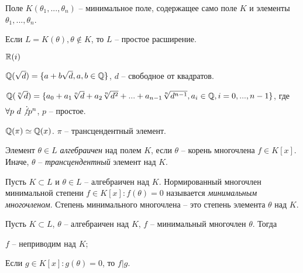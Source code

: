 
\begin{Def}
	Поле $K(\theta_1, ..., \theta_n)$ -- минимальное поле, содержащее само поле $K$ и элементы $\theta_1, ..., \theta_n$. 
\end{Def}

\begin{Def}
	Если $L = K(\theta), \theta \notin K$, то $L$ -- простое расширение. 
\end{Def}

\begin{Example}
	$\mathbb{R}(i)$ 
\end{Example}
	
\begin{Example}
	$\mathbb{Q}(\sqrt{d}) = \{a + b\sqrt{d}, a, b \in \mathbb{Q}\}$, $d$ -- свободное от квадратов.
\end{Example}

\begin{Example}
	$\mathbb{Q}(\sqrt[n]{d}) = \{a_0 + a_1\sqrt[n]{d} + a_2 \sqrt[n]{d^2} + ... + a_{n - 1}\sqrt[n]{d^{n - 1}}, a_i \in \mathbb{Q}, i = 0, ..., n - 1\}$, где $\forall p \ d \not\vdots p^n$, $p$ -- простое.
\end{Example}

\begin{Example}
	$\mathbb{Q}(\pi) \simeq \mathbb{Q}(x)$. $\pi$ -- трансцендентный элемент.
\end{Example}

\begin{Def}
	Элемент $\theta \in L$ \textit{алгебраичен}  над полем $K$, если $\theta$ -- корень многочлена $f \in K[x]$.
	Иначе, $\theta$ -- \textit{трансцендентный}  элемент над $K$.
\end{Def}
	
\begin{Def}
	Пусть $K \subset L$ и $\theta \in L$ -- алгебраичен над $K$. Нормированный многочлен минимальной степени $f \in K[x] : f(\theta) = 0$ называется
	\textit{минимальным многочленом}. Степень минимального многочлена -- это степень элемента $\theta$ над $K$.  
\end{Def}

\begin{Thm}
	Пусть $K \subset L$, $\theta$ -- алгебраичен над $K$, $f$ -- минимальный многочлен $\theta$.
	Тогда 
	\begin{MyList}
		\item $f$ -- неприводим над $K$;
		\item Если $g \in K[x] : g(\theta) = 0$, то $f | g$. 
	\end{MyList} 
\end{Thm}

